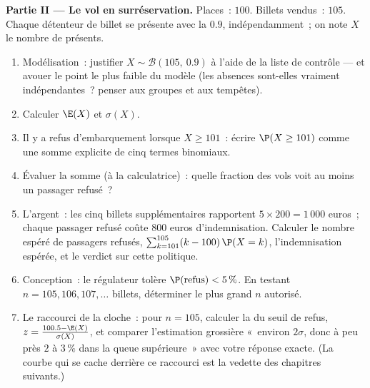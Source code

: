 \begin{problem}
\medskip
\noindent\textbf{Partie II --- Le vol en surréservation.}
Places~: $100$. Billets vendus~: $105$. Chaque détenteur de billet
se présente avec la  $0.9$, indépendamment~; on note $X$
le nombre de présents.
\begin{enumerate}[resume]
  \item Modélisation~: justifier $X \sim \mathcal B(105,\ 0.9)$ à
        l'aide de la liste de contrôle --- et avouer le point le
        plus faible du modèle (les absences sont-elles vraiment
        indépendantes~? penser aux groupes et aux tempêtes).
  \item Calculer $\E(X)$ et $\sigma(X)$.
  \item Il y a refus d'embarquement lorsque $X \geq 101$~: écrire
        $\P(X \geq 101)$ comme une somme explicite de cinq termes
        binomiaux.
  \item Évaluer la somme (à la calculatrice)~: quelle fraction des
        vols voit au moins un passager refusé~?
  \item L'argent~: les cinq billets supplémentaires rapportent
        $5 \times 200 = 1\,000$ euros~; chaque passager refusé
        coûte $800$ euros d'indemnisation. Calculer le nombre espéré
        de passagers refusés,
        $\sum_{k=101}^{105} (k - 100)\,\P(X = k)$, l'indemnisation
        espérée, et le verdict sur cette politique.
  \item Conception~: le régulateur tolère
        $\P(\text{refus}) < 5\,\%$. En testant
        $n = 105, 106, 107, \dots$ billets, déterminer le plus grand
        $n$ autorisé.
  \item Le raccourci de la cloche~: pour $n = 105$, calculer la
         du seuil de refus,
        $z = \frac{100.5 - \E(X)}{\sigma(X)}$, et comparer
        l'estimation grossière «~environ $2\sigma$, donc à peu près
        $2$ à $3\,\%$ dans la queue supérieure~» avec votre réponse
        exacte. (La courbe qui se cache derrière ce raccourci est la
        vedette des chapitres suivants.)
\end{enumerate}


\end{problem}
